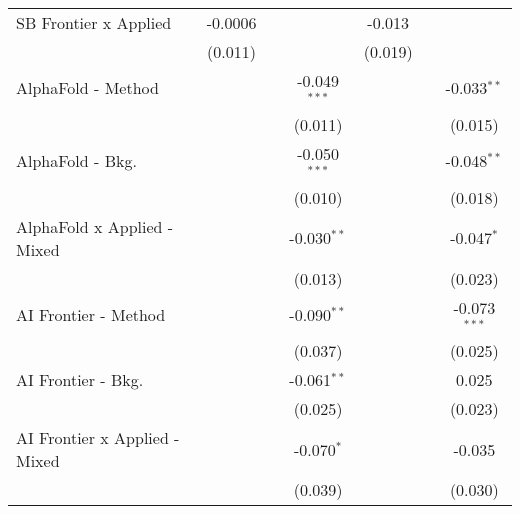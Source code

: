 \begin{tabular}{lcccccc}
   SB Frontier x Applied                       & -0.0006        &                &                & -0.013         &               &   \\   
                                               & (0.011)        &                &                & (0.019)        &               &   \\   
   AlphaFold - Method                          &                &                & -0.049$^{***}$ &                &               & -0.033$^{**}$\\   
                                               &                &                & (0.011)        &                &               & (0.015)\\   
   AlphaFold - Bkg.                            &                &                & -0.050$^{***}$ &                &               & -0.048$^{**}$\\   
                                               &                &                & (0.010)        &                &               & (0.018)\\   
   AlphaFold x Applied - Mixed                 &                &                & -0.030$^{**}$  &                &               & -0.047$^{*}$\\   
                                               &                &                & (0.013)        &                &               & (0.023)\\   
   AI Frontier - Method                        &                &                & -0.090$^{**}$  &                &               & -0.073$^{***}$\\   
                                               &                &                & (0.037)        &                &               & (0.025)\\   
   AI Frontier - Bkg.                          &                &                & -0.061$^{**}$  &                &               & 0.025\\   
                                               &                &                & (0.025)        &                &               & (0.023)\\   
   AI Frontier x Applied - Mixed               &                &                & -0.070$^{*}$   &                &               & -0.035\\   
                                               &                &                & (0.039)        &                &               & (0.030)\\   

\end{tabular}
